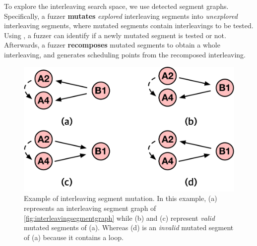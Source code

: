 To explore the interleaving search space, we use detected segment 
graphs.
%
Specifically, a fuzzer \textbf{mutates} \textit{explored} interleaving
segments into \textit{unexplored} interleaving segments, where mutated
segments contain interleavings to be tested.  Using \intcov, a fuzzer
can identify if a newly mutated segment is tested or not.
%
Afterwards, a fuzzer \textbf{recomposes} mutated segments to obtain a
\dr{}whole interleaving, and generates scheduling points from the
recomposed interleaving.
%

%
%


\begin{figure}[t]
  \centering
  \includegraphics[width=0.7\linewidth]{fig/interleavingmutation.pdf}
  \caption{Example of interleaving segment mutation. In this example,
    (a) represents an interleaving segment graph of
    \autoref{fig:interleavingsegmentgraph} while (b) and (c) represent
    \textit{valid} mutated segments of (a). Whereas (d) is an
    \textit{invalid} mutated segment of (a) because it contains a
    loop.}
  \label{fig:interleavingmutation}
\end{figure}

